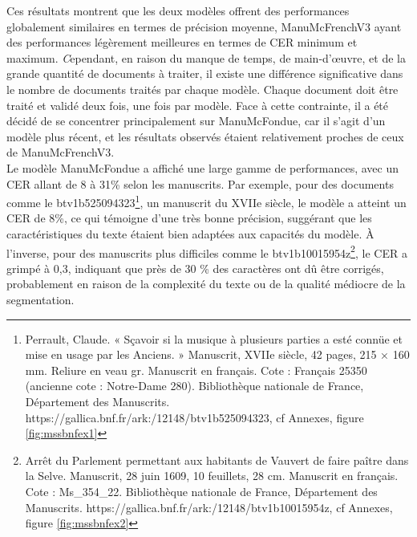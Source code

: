 \documentclass[a4paper,12pt,twoside]{book}
\begin{document}
	
	Ces résultats montrent que les deux modèles offrent des performances globalement similaires en termes de précision moyenne, ManuMcFrenchV3 ayant des performances légèrement meilleures en termes de CER minimum et maximum. \textit Cependant, en raison du manque de temps, de main-d’œuvre, et de la grande quantité de documents à traiter, il existe une différence significative dans le nombre de documents traités par chaque modèle. Chaque document doit être traité et validé deux fois, une fois par modèle. Face à cette contrainte, il a été décidé de se concentrer principalement sur ManuMcFondue, car il s’agit d’un modèle plus récent, et les résultats observés étaient relativement proches de ceux de ManuMcFrenchV3.
	\\
	
	Le modèle ManuMcFondue a affiché une large gamme de performances, avec un CER allant de 8 à 31\% selon les manuscrits. Par exemple, pour des documents comme le btv1b525094323\footnote{Perrault, Claude. « Sçavoir si la musique à plusieurs parties a esté connüe et mise en usage par les Anciens. » Manuscrit, XVIIe siècle, 42 pages, 215 × 160 mm. Reliure en veau gr. Manuscrit en français. Cote : Français 25350 (ancienne cote : Notre-Dame 280). Bibliothèque nationale de France, Département des Manuscrits. https://gallica.bnf.fr/ark:/12148/btv1b525094323,  cf Annexes, figure \ref{fig:mssbnfex1}}, un manuscrit du XVIIe siècle, le modèle a atteint un CER de 8\%, ce qui témoigne d’une très bonne précision, suggérant que les caractéristiques du texte étaient bien adaptées aux capacités du modèle. 	À l’inverse, pour des manuscrits plus difficiles comme le btv1b10015954z\footnote{Arrêt du Parlement permettant aux habitants de Vauvert de faire paître dans la Selve. Manuscrit, 28 juin 1609, 10 feuillets, 28 cm. Manuscrit en français. Cote : Ms\_354\_22. Bibliothèque nationale de France, Département des Manuscrits.	 https://gallica.bnf.fr/ark:/12148/btv1b10015954z, cf Annexes, figure \ref{fig:mssbnfex2}}, le CER a grimpé à 0,3, indiquant que près de 30 \% des caractères ont dû être corrigés, probablement en raison de la complexité du texte ou de la qualité médiocre de la segmentation.
	\\
\end{document}
